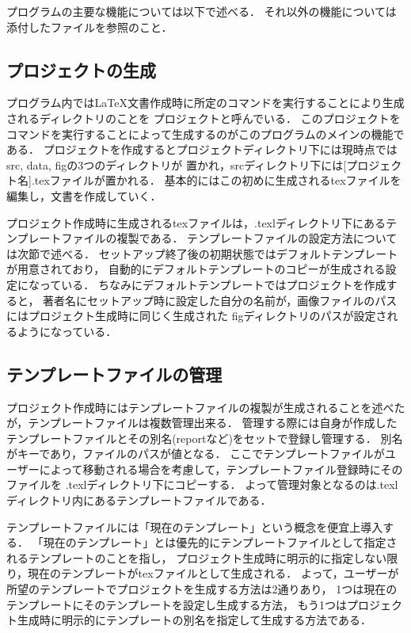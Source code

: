 \documentclass[dvipdfmx]{jsarticle}
\begin{document}
プログラムの主要な機能については以下で述べる．
それ以外の機能については添付したファイルを参照のこと．

\subsection{プロジェクトの生成}
プログラム内では\LaTeX 文書作成時に所定のコマンドを実行することにより生成されるディレクトリのことを
プロジェクトと呼んでいる．
このプロジェクトをコマンドを実行することによって生成するのがこのプログラムのメインの機能である．
プロジェクトを作成するとプロジェクトディレクトリ下には現時点ではsrc, data, figの3つのディレクトリが
置かれ，srcディレクトリ下には[プロジェクト名].texファイルが置かれる．
基本的にはこの初めに生成されるtexファイルを編集し，文書を作成していく．

プロジェクト作成時に生成されるtexファイルは，.texlディレクトリ下にあるテンプレートファイルの複製である．
テンプレートファイルの設定方法については次節で述べる．
セットアップ終了後の初期状態ではデフォルトテンプレートが用意されており，
自動的にデフォルトテンプレートのコピーが生成される設定になっている．
ちなみにデフォルトテンプレートではプロジェクトを作成すると，
著者名にセットアップ時に設定した自分の名前が，画像ファイルのパスにはプロジェクト生成時に同じく生成された
figディレクトリのパスが設定されるようになっている．

\subsection{テンプレートファイルの管理}
プロジェクト作成時にはテンプレートファイルの複製が生成されることを述べたが，テンプレートファイルは複数管理出来る．
管理する際には自身が作成したテンプレートファイルとその別名(reportなど)をセットで登録し管理する．
別名がキーであり，ファイルのパスが値となる．
ここでテンプレートファイルがユーザーによって移動される場合を考慮して，テンプレートファイル登録時にそのファイルを
.texlディレクトリ下にコピーする．
よって管理対象となるのは.texlディレクトリ内にあるテンプレートファイルである．

テンプレートファイルには「現在のテンプレート」という概念を便宜上導入する．
「現在のテンプレート」とは優先的にテンプレートファイルとして指定されるテンプレートのことを指し，
プロジェクト生成時に明示的に指定しない限り，現在のテンプレートがtexファイルとして生成される．
よって，ユーザーが所望のテンプレートでプロジェクトを生成する方法は2通りあり，
1つは現在のテンプレートにそのテンプレートを設定し生成する方法，
もう1つはプロジェクト生成時に明示的にテンプレートの別名を指定して生成する方法である．
\end{document}
